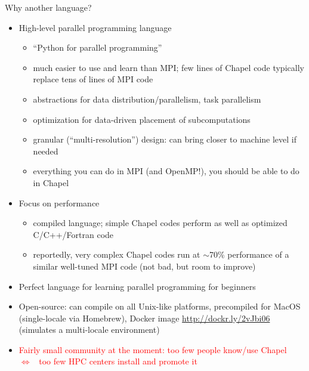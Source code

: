 \documentclass[10pt,xcolor=pdftex,dvipsnames,table]{beamer}
\newcommand{\tc}{\textcolor}
\begin{document}
\begin{frame}{Why another language? }
  \begin{itemize}\setlength{\itemsep}{2mm}
  \item High-level parallel programming language
    \smallskip
    {\let\small\footnotesize \small
      \begin{itemize}\setlength{\itemsep}{0.5mm}
      \item ``Python for parallel programming''
      \item much easier to use and learn than MPI; few lines of Chapel code typically replace tens of lines
        of MPI code
      \item abstractions for data distribution/parallelism, task parallelism
      \item optimization for data-driven placement of subcomputations
      \item granular (``multi-resolution'') design: can bring closer to machine level if needed
      \item everything you can do in MPI (and OpenMP!), you should be able to do in Chapel
    \end{itemize}}
  \item Focus on performance
    \smallskip
    {\let\small\footnotesize \small
      \begin{itemize}\setlength{\itemsep}{0.5mm}
      \item compiled language; simple Chapel codes perform as well as optimized C/C++/Fortran code
      \item reportedly, very complex Chapel codes run at $\sim$70\% performance of a similar well-tuned
        MPI code (not bad, but room to improve)
    \end{itemize}}
  \item Perfect language for learning parallel programming for beginners
  \item Open-source: can compile on all Unix-like platforms, precompiled for MacOS (single-locale via
    Homebrew), Docker image \url{http://dockr.ly/2vJbi06} (simulates a multi-locale environment)
  \item \tc{red}{Fairly small community at the moment: too few people know/use Chapel
    ~$\Longleftrightarrow$~ too few HPC centers install and promote it}
  \end{itemize}
\end{frame}
\end{document}
